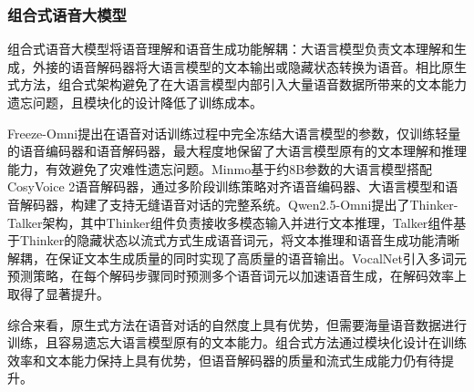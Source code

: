 \subsubsection{组合式语音大模型}\label{sec:rw_s2s_composite}

组合式语音大模型将语音理解和语音生成功能解耦：大语言模型负责文本理解和生成，外接的语音解码器将大语言模型的文本输出或隐藏状态转换为语音。相比原生式方法，组合式架构避免了在大语言模型内部引入大量语音数据所带来的文本能力遗忘问题，且模块化的设计降低了训练成本。

Freeze-Omni\citep{xiong2024freeze}提出在语音对话训练过程中完全冻结大语言模型的参数，仅训练轻量的语音编码器和语音解码器，最大程度地保留了大语言模型原有的文本理解和推理能力，有效避免了灾难性遗忘问题。Minmo\citep{chen2025minmo}基于约8B参数的大语言模型搭配CosyVoice 2语音解码器，通过多阶段训练策略对齐语音编码器、大语言模型和语音解码器，构建了支持无缝语音对话的完整系统。Qwen2.5-Omni\citep{alibaba2025qwen25omni}提出了Thinker-Talker架构，其中Thinker组件负责接收多模态输入并进行文本推理，Talker组件基于Thinker的隐藏状态以流式方式生成语音词元，将文本推理和语音生成功能清晰解耦，在保证文本生成质量的同时实现了高质量的语音输出。VocalNet\citep{vocalnet2025}引入多词元预测策略，在每个解码步骤同时预测多个语音词元以加速语音生成，在解码效率上取得了显著提升。

%

综合来看，原生式方法在语音对话的自然度上具有优势，但需要海量语音数据进行训练，且容易遗忘大语言模型原有的文本能力。组合式方法通过模块化设计在训练效率和文本能力保持上具有优势，但语音解码器的质量和流式生成能力仍有待提升。


